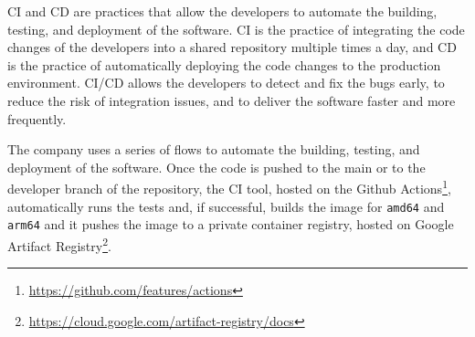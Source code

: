 CI and CD are practices that allow the developers to automate the building, testing, and deployment of the software. CI is the practice of integrating the code changes of the developers into a shared repository multiple times a day, and CD is the practice of automatically deploying the code changes to the production environment. CI/CD allows the developers to detect and fix the bugs early, to reduce the risk of integration issues, and to deliver the software faster and more frequently.

The company uses a series of flows to automate the building, testing, and deployment of the software.
Once the code is pushed to the main or to the developer branch of the repository, the CI tool, hosted on the Github Actions\footnote{\url{https://github.com/features/actions}}, automatically runs the tests and, if successful, builds the image for \texttt{amd64} and \texttt{arm64} and it pushes the image to a private container registry, hosted on Google Artifact Registry\footnote{\url{https://cloud.google.com/artifact-registry/docs}}.

